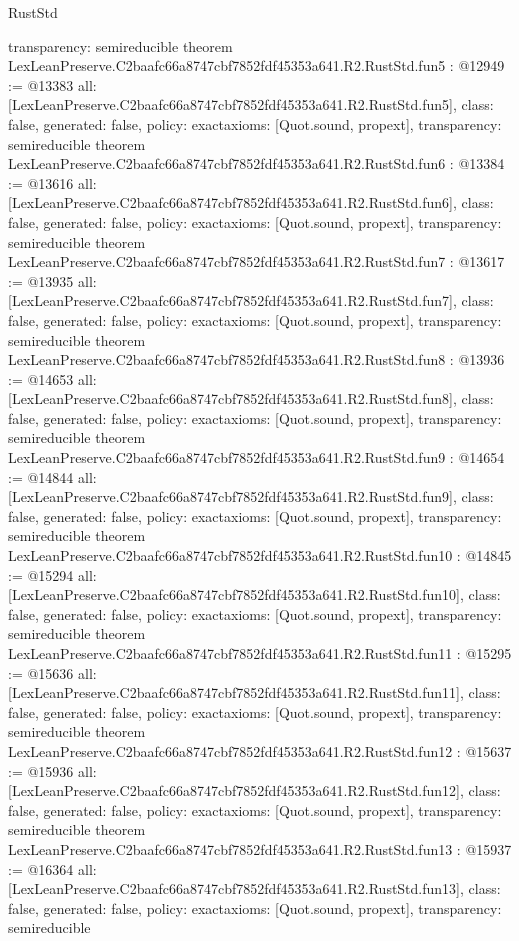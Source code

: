 \begin{lexlean}{RustStd}
\begin{coremodule}
{  transparency: semireducible
}
theorem LexLeanPreserve.C2baafc66a8747cbf7852fdf45353a641.R2.RustStd.fun5 : @12949 := @13383 {
  all: [LexLeanPreserve.C2baafc66a8747cbf7852fdf45353a641.R2.RustStd.fun5],
  class: false,
  generated: false,
  policy: exact{axioms: [Quot.sound, propext]},
  transparency: semireducible
}
theorem LexLeanPreserve.C2baafc66a8747cbf7852fdf45353a641.R2.RustStd.fun6 : @13384 := @13616 {
  all: [LexLeanPreserve.C2baafc66a8747cbf7852fdf45353a641.R2.RustStd.fun6],
  class: false,
  generated: false,
  policy: exact{axioms: [Quot.sound, propext]},
  transparency: semireducible
}
theorem LexLeanPreserve.C2baafc66a8747cbf7852fdf45353a641.R2.RustStd.fun7 : @13617 := @13935 {
  all: [LexLeanPreserve.C2baafc66a8747cbf7852fdf45353a641.R2.RustStd.fun7],
  class: false,
  generated: false,
  policy: exact{axioms: [Quot.sound, propext]},
  transparency: semireducible
}
theorem LexLeanPreserve.C2baafc66a8747cbf7852fdf45353a641.R2.RustStd.fun8 : @13936 := @14653 {
  all: [LexLeanPreserve.C2baafc66a8747cbf7852fdf45353a641.R2.RustStd.fun8],
  class: false,
  generated: false,
  policy: exact{axioms: [Quot.sound, propext]},
  transparency: semireducible
}
theorem LexLeanPreserve.C2baafc66a8747cbf7852fdf45353a641.R2.RustStd.fun9 : @14654 := @14844 {
  all: [LexLeanPreserve.C2baafc66a8747cbf7852fdf45353a641.R2.RustStd.fun9],
  class: false,
  generated: false,
  policy: exact{axioms: [Quot.sound, propext]},
  transparency: semireducible
}
theorem LexLeanPreserve.C2baafc66a8747cbf7852fdf45353a641.R2.RustStd.fun10 : @14845 := @15294 {
  all: [LexLeanPreserve.C2baafc66a8747cbf7852fdf45353a641.R2.RustStd.fun10],
  class: false,
  generated: false,
  policy: exact{axioms: [Quot.sound, propext]},
  transparency: semireducible
}
theorem LexLeanPreserve.C2baafc66a8747cbf7852fdf45353a641.R2.RustStd.fun11 : @15295 := @15636 {
  all: [LexLeanPreserve.C2baafc66a8747cbf7852fdf45353a641.R2.RustStd.fun11],
  class: false,
  generated: false,
  policy: exact{axioms: [Quot.sound, propext]},
  transparency: semireducible
}
theorem LexLeanPreserve.C2baafc66a8747cbf7852fdf45353a641.R2.RustStd.fun12 : @15637 := @15936 {
  all: [LexLeanPreserve.C2baafc66a8747cbf7852fdf45353a641.R2.RustStd.fun12],
  class: false,
  generated: false,
  policy: exact{axioms: [Quot.sound, propext]},
  transparency: semireducible
}
theorem LexLeanPreserve.C2baafc66a8747cbf7852fdf45353a641.R2.RustStd.fun13 : @15937 := @16364 {
  all: [LexLeanPreserve.C2baafc66a8747cbf7852fdf45353a641.R2.RustStd.fun13],
  class: false,
  generated: false,
  policy: exact{axioms: [Quot.sound, propext]},
  transparency: semireducible
}
\end{coremodule}
\end{lexlean}
